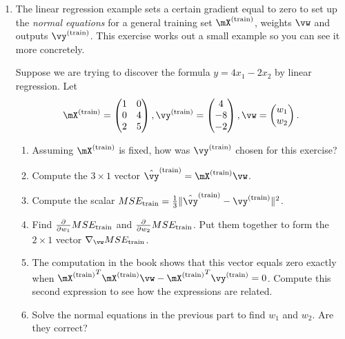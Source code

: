 \documentclass{article}
\newcommand{\utrain}{^{\textnormal{(train)}}}
\newcommand{\strain}{_{\textnormal{train}}}
\begin{document}
\begin{enumerate}

\item \label{ML_ex_regression} 
The linear regression example sets a certain gradient equal to zero to set up the \emph{normal equations} for a general training set $\mX\utrain$, weights $\vw$ and outputs $\vy\utrain$. This exercise works out a small example so you can see it more concretely.

Suppose we are trying to discover the formula $y = 4x_1 - 2x_2$ by linear regression. Let
\begin{equation*}
  \mX\utrain =  \begin{pmatrix}
                1 & 0 \\
                0 & 4 \\
                2 & 5
                \end{pmatrix}, 
  \vy\utrain =  \begin{pmatrix}
                4 \\
                -8 \\
                -2
                \end{pmatrix},
  \vw           = \begin{pmatrix}
                w_1 \\
                w_2
                \end{pmatrix}.
\end{equation*}                
\begin{enumerate}
    \item Assuming $\mX\utrain$ is fixed, how was $\vy\utrain$ chosen for this exercise?
    \item Compute the $3\times1$ vector $\hat{\vy}\utrain = \mX\utrain\vw$. 
    \item Compute the scalar $MSE\strain = \frac13 \lVert \hat{\vy}\utrain - \vy\utrain \rVert^2$.
    \item Find $\frac{\partial}{\partial w_1} MSE\strain$ and $\frac{\partial}{\partial w_2} MSE\strain$. Put them together to form the $2\times1$ vector $\nabla_\vw MSE\strain$.
    \item The computation in the book shows that this vector equals zero exactly when ${\mX\utrain}^T\mX\utrain\vw - {\mX\utrain}^T\vy\utrain = 0$. Compute this second expression to see how the expressions are related.
    \item Solve the normal equations in the previous part to find $w_1$ and $w_2$. Are they correct?
\end{enumerate}


\end{enumerate}
\end{document}
